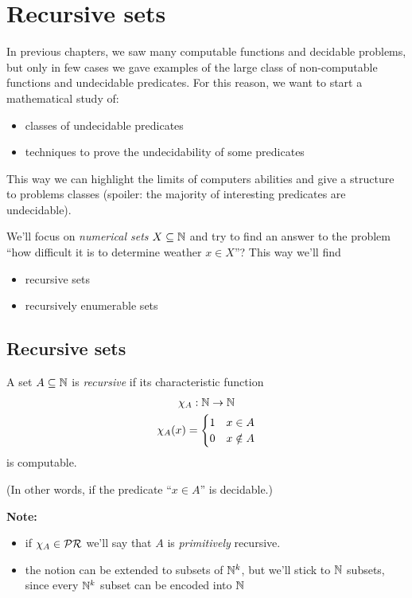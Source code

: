 \chapter{Recursive sets}
In previous chapters, we saw many computable functions and decidable problems, but
only in few cases we gave examples of the large class of
non-computable functions and undecidable predicates. For this reason,
we want to start a mathematical study of:
\begin{itemize}
\item classes of undecidable predicates
\item techniques to prove the undecidability of some predicates
\end{itemize}
This way we can highlight the limits of computers abilities and give a
structure to problems classes (spoiler: the majority of interesting
predicates are undecidable).

We'll focus on \emph{numerical sets} $X \subseteq \mathbb{N}$ and try to find
an answer to the problem ``how difficult it is to determine weather
$x \in X$''? This way we'll find
\begin{itemize}
\item recursive sets
\item recursively enumerable sets
\end{itemize}

\section{Recursive sets}
\begin{definition}
  A set $A \subseteq \mathbb{N}$ is \emph{recursive} if its characteristic
  function
  \begin{gather*}
    \chi_A : \mathbb{N} \rightarrow \mathbb{N} \\
    \chi_A(x) = \begin{cases}
      1 & x\in A \\
      0 & x \notin A
    \end{cases}
  \end{gather*}
  is computable.
\end{definition}

(In other words, if the predicate ``$x \in A$'' is decidable.)

\textbf{Note:}
\begin{itemize}
\item if $\chi_A \in \mathcal{PR}$ we'll say that $A$ is \emph{primitively}
  recursive.
\item the notion can be extended to subsets of $\mathbb{N}^k$, but we'll
  stick to $\mathbb{N}$ subsets, since every $\mathbb{N}^k$ subset can be encoded
  into $\mathbb{N}$
\end{itemize}

